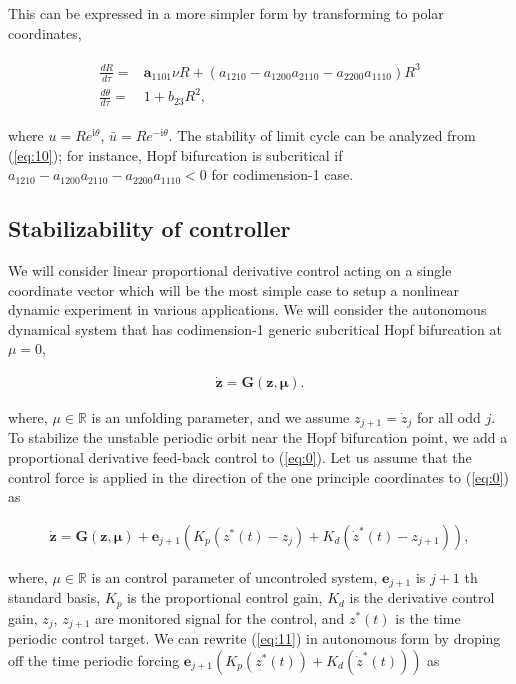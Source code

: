\documentclass[openacc]{rsproca_new}%
\def\real{\mathbb{R}}
\def\vec#1{\ensuremath{\mathbf{#1}}}
\newcommand{\Eref}[1]{(\ref{#1})}
\begin{document}
\noindent This can be expressed in a more simpler form by transforming to polar coordinates,

\begin{align}\label{eq:10}
\begin{split}
\frac{dR}{d\tau}=&\vec{a}_{1101}\nu R+(a_{1210}-a_{1200}a_{2110}-a_{2200}a_{1110})R^3\\
\frac{d\theta}{d\tau}=&1+b_{23}R^2,
\end{split}
\end{align}

\noindent where $u=Re^{\textrm{i} \theta}$, $\bar u=Re^{-\textrm{i} \theta}$. The stability of limit cycle can be analyzed from \Eref{eq:10}; for instance, Hopf bifurcation is subcritical if \(a_{1210}-a_{1200}a_{2110}-a_{2200}a_{1110}<0\) for codimension-1 case.


\subsection{Stabilizability of controller}

We will consider linear proportional derivative control acting on a single coordinate vector which will be the most simple case to setup a nonlinear dynamic experiment in various applications. We will consider the autonomous dynamical system that has codimension-1 generic subcritical Hopf bifurcation at $\mu=0$,

\begin{align}\label{eq:0}
    \dot{\vec{z}} =\vec{G}(\vec{z},\vec{\mu}).
\end{align}

\noindent where, $\mu\in \real$ is an unfolding parameter, and we assume $z_{j+1}=\dot z_j$ for all odd $j$. To stabilize the unstable periodic orbit near the Hopf bifurcation point, we add a proportional derivative feed-back control to \Eref{eq:0}. Let us assume that the control force is applied in the direction of the one principle coordinates to \Eref{eq:0} as

\begin{align}\label{eq:11}
    \dot{\vec{z}} =\vec{G}(\vec{z},\vec{\mu})+\vec{e}_{j+1}(K_p(z^*(t)-z_j)+K_d(\dot z^*(t)-z_{j+1})),
\end{align}

\noindent where, $\mu\in \real$ is an control parameter of uncontroled system, $\vec{e}_{j+1}$ is $j+1$ th standard basis, $K_p$ is the proportional control gain, $K_d$ is the derivative control gain, $z_{j}$, $z_{j+1}$ are monitored signal for the control, and $z^*(t)$  is the time periodic control target. We can rewrite \Eref{eq:11} in autonomous form by droping off the time periodic forcing $\vec{e}_{j+1}(K_p(z^*(t))+K_d(\dot z^*(t)))$ as
\end{document}

